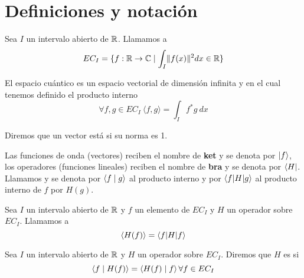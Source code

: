 \section{Definiciones y notación}
\begin{definicion}
    Sea $I$ un intervalo abierto de $\mathbb{R}$. Llamamos  a
    \begin{equation}
        EC_I=\{f:\mathbb{R}\rightarrow\mathbb{C}\mid\int_I\lVert f(x)\rVert^2 dx \in \mathbb{R}\}
    \end{equation}
\end{definicion}

El espacio cuántico es un espacio vectorial de dimensión infinita y en el cual tenemos definido el producto interno
\begin{equation}
    \forall f,g\in EC_I \ \langle f,g \rangle=\int_I f^* g\ dx
\end{equation}

\begin{definicion}
    Diremos que un vector está  si su norma es 1.
\end{definicion}

Las funciones de onda (vectores) reciben el nombre de \textbf{ket} y se denota por $\left\lvert f\right\rangle$, los operadores (funciones lineales) reciben el nombre de \textbf{bra} y se denota por $\left\langle H\right\rvert$. Llamamos  y se denota por $\left\langle f\mid g\right\rangle$ al producto interno y por $\left\langle f|H|g\right\rangle$ al producto interno de $f$ por $H(g)$.

\begin{definicion}
    Sea $I$ un intervalo abierto de $\mathbb{R}$ y $f$ un elemento de $EC_I$ y $H$ un operador sobre $EC_I$. Llamamos  a
    \begin{equation}
        \left\langle H(f)\right\rangle=\left\langle f|H|f\right\rangle
    \end{equation}
\end{definicion}


\begin{definicion}
    Sea $I$ un intervalo abierto de $\mathbb{R}$ y $H$ un operador sobre $EC_I$. Diremos que $H$ es  si
    \begin{equation}
        \left\langle f\mid H(f)\right\rangle=\left\langle H(f)\mid f\right\rangle\forall f\in EC_I
    \end{equation}
\end{definicion}